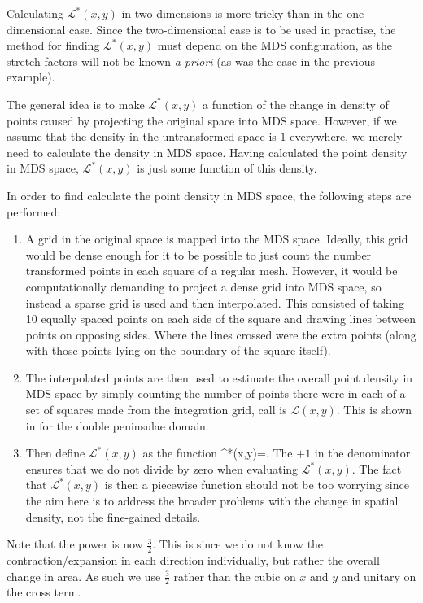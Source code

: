 Calculating $\mathcal{L}^*(x,y)$ in two dimensions is more tricky than in the one dimensional case. Since the two-dimensional case is to be used in practise, the method for finding $\mathcal{L}^*(x,y)$ must depend on the MDS configuration, as the stretch factors will not be known \emph{a priori} (as was the case in the previous example).

The general idea is to make $\mathcal{L}^*(x,y)$ a function of the change in density of points caused by projecting the original space into MDS space. However, if we assume that the density in the untransformed space is $1$ everywhere, we merely need to calculate the density in MDS space. Having calculated the point density in MDS space, $\mathcal{L}^*(x,y)$ is just some function of this density.

In order to find calculate the point density in MDS space, the following steps are performed:

\begin{enumerate}
\item A grid in the original space is mapped into the MDS space. Ideally, this grid would be dense enough for it to be possible to just count the number transformed points in each square of a regular mesh. However, it would be computationally demanding to project a dense grid into MDS space, so instead a sparse grid is used and then interpolated. This consisted of taking 10 equally spaced points on each side of the square and drawing lines between points on opposing sides. Where the lines crossed were the extra points (along with those points lying on the boundary of the square itself).
\item The interpolated points are then used to estimate the overall point density in MDS space by simply counting the number of points there were in each of a set of squares made from the integration grid, call is $\mathcal{L}(x,y)$. This is shown in  for the double peninsulae domain. 
\item Then define $\mathcal{L}^*(x,y)$ as the function
\be
{}^*(x,y)=.
\ee
The $+1$ in the denominator ensures that we do not divide by zero when evaluating $\mathcal{L}^*(x,y)$. The fact that $\mathcal{L}^*(x,y)$ is then a piecewise function should not be too worrying since the aim here is to address the broader problems with the change in spatial density, not the fine-gained details.
\end{enumerate}

Note that the power is now $\frac{3}{2}$. This is since we do not know the contraction/expansion in each direction individually, but rather the overall change in area. As such we use $\frac{3}{2}$ rather than the cubic on $x$ and $y$ and unitary on the cross term.

